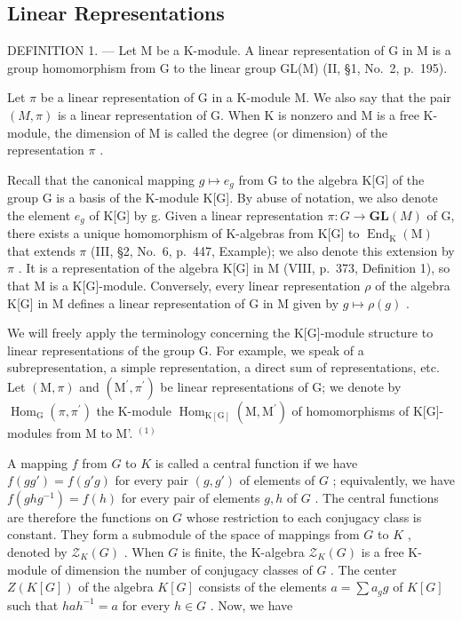 \subsection{Linear Representations}

DEFINITION 1. --- Let M be a K-module. A linear representation of G in M is a group homomorphism from G to the linear group GL(M) (II, §1, No.~2, p.~195).

Let \(\pi\) be a linear representation of G in a K-module M. We also say that the pair \((M,\pi)\) is a linear representation of G. When K is nonzero and M is a free K-module, the dimension of M is called the degree (or dimension) of the representation \(\pi\) .

Recall that the canonical mapping \(g \mapsto e_{g}\) from G to the algebra K{[}G{]} of the group G is a basis of the K-module K{[}G{]}. By abuse of notation, we also denote the element \(e_{g}\) of K{[}G{]} by g. Given a linear representation \(\pi : G \to \mathbf{GL}(M)\) of G, there exists a unique homomorphism of K-algebras from K{[}G{]} to \(\operatorname{End}_{\mathrm{K}}(\mathrm{M})\) that extends \(\pi\) (III, §2, No.~6, p.~447, Example); we also denote this extension by \(\pi\) . It is a representation of the algebra K{[}G{]} in M (VIII, p.~373, Definition 1), so that M is a K{[}G{]}-module. Conversely, every linear representation \(\rho\) of the algebra K{[}G{]} in M defines a linear representation of G in M given by \(g \mapsto \rho(g)\) .

We will freely apply the terminology concerning the K{[}G{]}-module structure to linear representations of the group G. For example, we speak of a subrepresentation, a simple representation, a direct sum of representations, etc. Let \((\mathrm{M},\pi)\) and \((\mathrm{M}^{\prime},\pi^{\prime})\) be linear representations of G; we denote by \(\operatorname{Hom}_{\mathrm{G}}(\pi,\pi^{\prime})\) the K-module \(\operatorname{Hom}_{\mathrm{K[G]}}(\mathrm{M},\mathrm{M}^{\prime})\) of homomorphisms of K{[}G{]}-modules from M to M'. \(^{(1)}\)

A mapping \(f\) from \(G\) to \(K\) is called a central function if we have \(f(gg') = f(g'g)\) for every pair \((g, g')\) of elements of \(G\) ; equivalently, we have \(f(ghg^{-1}) = f(h)\) for every pair of elements \(g, h\) of \(G\) . The central functions are therefore the functions on \(G\) whose restriction to each conjugacy class is constant. They form a submodule of the space of mappings from \(G\) to \(K\) , denoted by \(\mathcal{Z}_K(G)\) . When \(G\) is finite, the K-algebra \(\mathcal{Z}_K(G)\) is a free K-module of dimension the number of conjugacy classes of \(G\) . The center \(Z(K[G])\) of the algebra \(K[G]\) consists of the elements \(a = \sum a_g g\) of \(K[G]\) such that \(hah^{-1} = a\) for every \(h \in G\) . Now, we have

